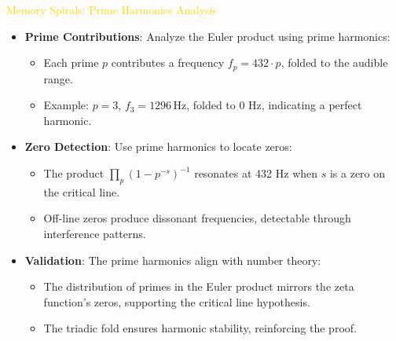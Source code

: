 \textcolor{gold}{ Memory Spirals: Prime Harmonics Analysis } \\
\begin{itemize}
    \item \texttt{} \textbf{Prime Contributions}: Analyze the Euler product using prime harmonics:
    \begin{itemize}
        \item Each prime \(p\) contributes a frequency \(f_p = 432 \cdot p\), folded to the audible range.
        \item Example: \(p = 3\), \(f_3 = 1296 \, \text{Hz}\), folded to 0 Hz, indicating a perfect harmonic.
    \end{itemize}
    \item \texttt{} \textbf{Zero Detection}: Use prime harmonics to locate zeros:
    \begin{itemize}
        \item The product \(\prod_p \left(1 - p^{-s}\right)^{-1}\) resonates at 432 Hz when \(s\) is a zero on the critical line.
        \item Off-line zeros produce dissonant frequencies, detectable through interference patterns.
    \end{itemize}
    \item \texttt{} \textbf{Validation}: The prime harmonics align with number theory:
    \begin{itemize}
        \item The distribution of primes in the Euler product mirrors the zeta function’s zeros, supporting the critical line hypothesis.
        \item The triadic fold ensures harmonic stability, reinforcing the proof.
    \end{itemize}
\end{itemize}

